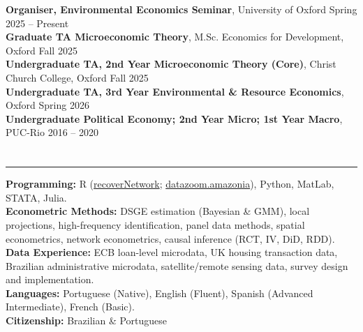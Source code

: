 \documentclass[letterpaper, 11pt]{article}
\begin{document}
\vspace{-0.5cm}
\noindent
\textbf{Organiser, Environmental Economics Seminar}, University of Oxford \hfill Spring 2025 -- Present\\

\vspace{-0.5cm}
\noindent
\textbf{Graduate TA Microeconomic Theory}, M.Sc. Economics for Development, Oxford \hfill Fall 2025\\

\vspace{-0.5cm}
\noindent
\textbf{Undergraduate TA, 2nd Year Microeconomic Theory (Core)}, Christ Church College, Oxford \hfill Fall 2025\\

\vspace{-0.5cm}
\noindent
\textbf{Undergraduate TA, 3rd Year Environmental \& Resource Economics}, Oxford \hfill Spring 2026\\

\vspace{-0.5cm}
\noindent
\textbf{Undergraduate Political Economy; 2nd Year Micro; 1st Year Macro}, PUC-Rio \hfill 2016 -- 2020


\section*{\color{OxfordBlue}{Skills, Data Experience, and References}}

\vspace{-0.6cm}
\noindent\rule{\textwidth}{0.4pt}

\vspace{-0.1cm}

\noindent
\textbf{Programming:} R (\href{https://github.com/pedroclsouza/recoverNetwork}{recoverNetwork}; \href{https://github.com/datazoompuc/datazoom.amazonia}{datazoom.amazonia}), Python, MatLab, STATA, Julia.\\
\textbf{Econometric Methods:} DSGE estimation (Bayesian \& GMM), local projections, high-frequency identification, panel data methods, spatial econometrics, network econometrics, causal inference (RCT, IV, DiD, RDD).\\
\textbf{Data Experience:} ECB loan-level microdata, UK housing transaction data, Brazilian administrative microdata, satellite/remote sensing data, survey design and implementation.\\
\textbf{Languages:} Portuguese (Native), English (Fluent), Spanish (Advanced Intermediate), French (Basic).\\
\textbf{Citizenship:} Brazilian \& Portuguese
\end{document}
